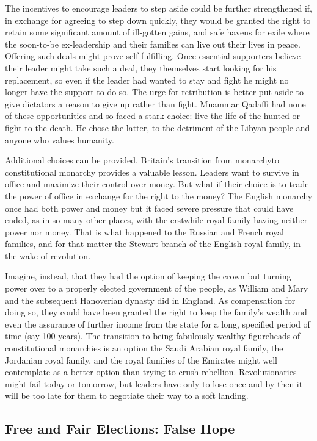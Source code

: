 \documentclass[10pt]{article}
\begin{document}
{\large The incentives to encourage leaders to step aside could be further
strengthened if, in exchange for agreeing to step down quickly, they would be
granted the right to retain some significant amount of ill-gotten gains, and safe
havens for exile where the soon-to-be ex-leadership and their families can live
out their lives in peace. Offering such deals might prove self-fulfilling. Once
essential supporters believe their leader might take such a deal, they themselves
start looking for his replacement, so even if the leader had wanted to stay and
fight he might no longer have the support to do so. The urge for retribution is
better put aside to give dictators a reason to give up rather than fight. Muammar
Qadaffi had none of these opportunities and so faced a stark choice: live the
life of the hunted or fight to the death. He chose the latter, to the detriment
of the Libyan people and anyone who values humanity.}

{\large Additional choices can be provided. Britain's transition from monarchyto
constitutional monarchy provides a valuable lesson. Leaders want to survive in
office and maximize their control over money. But what if their choice is to
trade the power of office in exchange for the right to the money? The English
monarchy once had both power and money but it faced severe pressure that could
have ended, as in so many other places, with the erstwhile royal family having
neither power nor money. That is what happened to the Russian and French royal
families, and for that matter the Stewart branch of the English royal family, in
the wake of revolution.}

{\large Imagine, instead, that they had the option of keeping the crown but
turning power over to a properly elected government of the people, as William and
Mary and the subsequent Hanoverian dynasty did in England. As compensation for
doing so, they could have been granted the right to keep the family's wealth and
even the assurance of further income from the state for a long, specified period
of time (say 100 years). The transition to being fabulously wealthy figureheads
of constitutional monarchies is an option the Saudi Arabian royal family, the
Jordanian royal family, and the royal families of the Emirates might well
contemplate as a better option than trying to crush rebellion. Revolutionaries
might fail today or tomorrow, but leaders have only to lose once and by then it
will be too late for them to negotiate their way to a soft landing.}

\subsection{Free and Fair Elections: False Hope}
\end{document}
